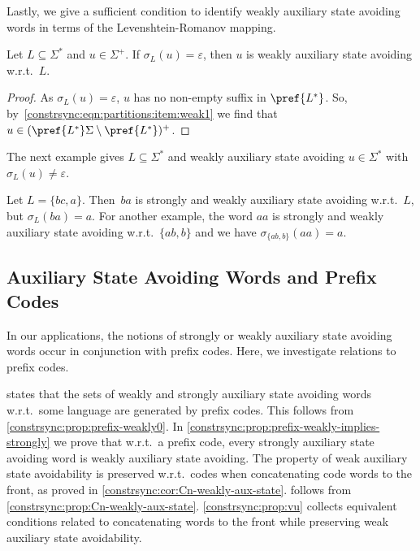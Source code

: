 Lastly, we give a sufficient condition to identify weakly auxiliary state
avoiding words in terms of the Levenshtein-Romanov mapping.

\begin{proposition} \label{constr_sync:prop:aux_state_sigmaL}
	Let $L \subseteq \Sigma^*$ and $u \in \Sigma^+$.
	If $\sigma_L(u) = \varepsilon$, then $u$ is weakly
	auxiliary state avoiding w.r.t.~$L$.	
\end{proposition} 
\begin{proof}
	As $\sigma_{L}(u) = \varepsilon$, $u$
	has no non-empty suffix in $\pref{L^*}$.
	So, by~\cref{constrsync:eqn:partitions:item:weak1}
	we find that  $u \in (\pref{L^*}\Sigma \setminus \pref{L^*})^+$.
\end{proof} 

The next example gives $L \subseteq \Sigma^*$ and weakly auxiliary state avoiding $u \in \Sigma^*$
with $\sigma_L(u) \ne \varepsilon$.

\begin{example}
	Let $L = \{bc, a\}$.
	Then~$ba$ is strongly and weakly auxiliary state avoiding w.r.t.~$L$, but $\sigma_L(ba) = a$.
	For another example, the word $aa$ is strongly and weakly auxiliary state
	avoiding w.r.t.~$\{ab,b\}$ and we have $\sigma_{\{ab,b\}}(aa) = a$.	
\end{example}

\subsection{Auxiliary State Avoiding Words and Prefix Codes}
\label{constrsync:sec:auxcodes}

In our applications, the notions of strongly or weakly auxiliary state avoiding words
occur in conjunction with prefix codes. Here,
we investigate relations to prefix codes.

 states that the sets of weakly and strongly auxiliary 
state avoiding words w.r.t.~some language
are generated by prefix codes. This follows from \cref{constrsync:prop:prefix-weakly0}.
In \cref{constrsync:prop:prefix-weakly-implies-strongly}
we prove that w.r.t.~a prefix code, every strongly auxiliary state avoiding
word is weakly auxiliary state avoiding.
The property of weak auxiliary state avoidability
is preserved w.r.t.~codes when concatenating 
code words to the front, as proved in \cref{constrsync:cor:Cn-weakly-aux-state}.
 follows from \cref{constrsync:prop:Cn-weakly-aux-state}.
\cref{constrsync:prop:vu} collects 
equivalent conditions related to concatenating
words to the front while preserving weak auxiliary state avoidability.

